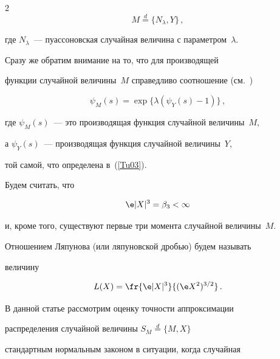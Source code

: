 \begin{multicols}{2}
\begin{equation}


 M \stackrel{d}{=} \{N_{\lambda},Y\}\,,


 \label{Tu03}


\end{equation}


где $N_{\lambda}$~--- пуассоновская случайная величина с параметром~$\lambda$. 


Сразу же обратим внимание на то, что для производящей


функции случайной величины~$M$ справедливо соотношение (см.~\cite{3g})


\begin{equation}


 \psi_M(s) = \exp \{\lambda(\psi_Y(s)-1)\}\,,


 \label{Tu04}


\end{equation}


где $\psi_M(s)$~--- это производящая функция случайной величины~$M$, 


а $\psi_Y(s)$~--- производящая функция случайной величины~$Y$,


той самой, что определена в~(\ref{Tu03}).





Будем считать, что


\begin{equation}


 \e |X|^3=\beta_3<\infty


 \label{Tu07}


\end{equation}


и, кроме того, существуют первые три момента случайной величины~$M$.





Отношением Ляпунова (или ляпуновской \mbox{дробью}) будем называть


величину


$$


L(X) = \fr{\e |X|^3}{(\e X^2)^{3/2}}\,.


$$





В данной статье рассмотрим оценку точности аппроксимации


распределения случайной величины $S_M \stackrel{d}{=}  \{M,X\}$


стандартным нормальным законом в ситуации, когда случайная



\end{multicols}

